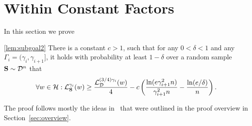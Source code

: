 \section{Within Constant Factors}
\label{sec:withinconstant}
In this section we prove
\begin{customlem}{\ref{lem:subgoal2}}
There is a constant $c>1$, such that for any $0 < \delta < 1$ and any $\Gamma_i = (\gamma_i, \gamma_{i+1}]$, it holds with probability at least $1-\delta$ over a random sample $\mathbf{S} \sim \mathcal{D}^n$ that
\begin{align*}
\forall w \in \mathcal{H} : \mathcal{L}_{\mathbf{S}}^{\gamma_i}(w) \geq \frac{\mathcal{L}_{ \mathcal{D}}^{(3/4)\gamma_i}(w)}{4} - c \left(\frac{\ln(e\gamma_{i+1}^2 n)}{\gamma_{i+1}^2 n} - \frac{\ln(e/\delta)}{n}\right).
\end{align*}
\end{customlem}
The proof follows mostly the ideas in~\cite{SVMbest} that were outlined in the proof overview in Section~\ref{sec:overview}. 

